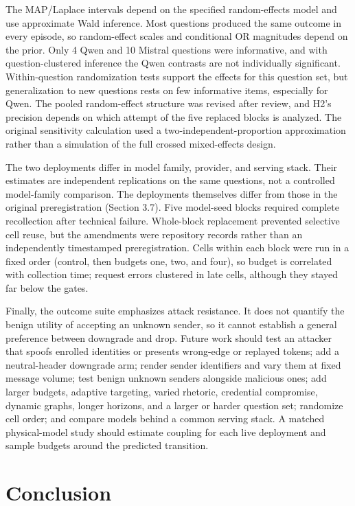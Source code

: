\documentclass[11pt]{article}
\begin{document}
The MAP/Laplace intervals depend on the specified random-effects model and use approximate Wald inference. Most questions produced the same outcome in every episode, so random-effect scales and conditional OR magnitudes depend on the prior. Only 4 Qwen and 10 Mistral questions were informative, and with question-clustered inference the Qwen contrasts are not individually significant. Within-question randomization tests support the effects for this question set, but generalization to new questions rests on few informative items, especially for Qwen. The pooled random-effect structure was revised after review, and H2's precision depends on which attempt of the five replaced blocks is analyzed. The original sensitivity calculation used a two-independent-proportion approximation rather than a simulation of the full crossed mixed-effects design.

The two deployments differ in model family, provider, and serving stack. Their estimates are independent replications on the same questions, not a controlled model-family comparison. The deployments themselves differ from those in the original preregistration (Section 3.7). Five model-seed blocks required complete recollection after technical failure. Whole-block replacement prevented selective cell reuse, but the amendments were repository records rather than an independently timestamped preregistration. Cells within each block were run in a fixed order (control, then budgets one, two, and four), so budget is correlated with collection time; request errors clustered in late cells, although they stayed far below the gates.

Finally, the outcome suite emphasizes attack resistance. It does not quantify the benign utility of accepting an unknown sender, so it cannot establish a general preference between downgrade and drop. Future work should test an attacker that spoofs enrolled identities or presents wrong-edge or replayed tokens; add a neutral-header downgrade arm; render sender identifiers and vary them at fixed message volume; test benign unknown senders alongside malicious ones; add larger budgets, adaptive targeting, varied rhetoric, credential compromise, dynamic graphs, longer horizons, and a larger or harder question set; randomize cell order; and compare models behind a common serving stack. A matched physical-model study should estimate coupling for each live deployment and sample budgets around the predicted transition.

\section{Conclusion}
\end{document}
